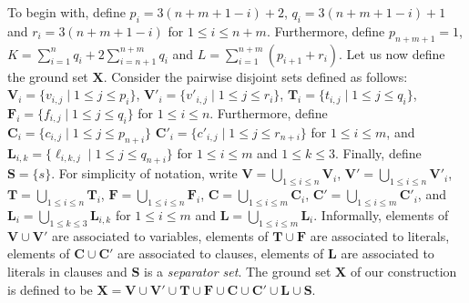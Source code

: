 \documentclass[a4paper,10pt]{llncs}
\begin{document}
To begin with, define 
$p_i = 3(n + m + 1 - i) + 2$,
$q_i = 3(n + m + 1 - i) + 1$ and
$r_i = 3(n + m + 1 - i)$ for $1 \leq i \leq n + m$.
Furthermore, define $p_{n+m+1}=1$,
$K = \sum_{i=1}^{n} q_i + 2 \sum_{i=n+1}^{n+m} q_i$ and
$L = \sum_{i=1}^{n+m} (p_{i+1} + r_i)$.
Let us now define the ground set $\mathbf{X}$. 
Consider the pairwise disjoint sets defined as follows:
$\mathbf{V}_i = \{v_{i, j} \mid 1 \leq j \leq p_i\}$,
$\mathbf{V}'_i  = \{v'_{i, j} \mid 1 \leq j \leq r_i\}$,
$\mathbf{T}_i = \{t_{i, j} \mid 1 \leq j \leq q_i\}$,
$\mathbf{F}_i = \{f_{i, j} \mid 1 \leq j \leq q_i\}$
for $1 \leq i \leq n$. Furthermore, define
$\mathbf{C}_i = \{c_{i, j} \mid 1 \leq j \leq p_{n + i}\}$
$\mathbf{C}'_i = \{c'_{i, j} \mid 1 \leq j \leq r_{n + i}\}$
for $1 \leq i \leq m$, and
$\mathbf{L}_{i, k} = \{\ell_{i, k, j} \mid 1 \leq j \leq q_{n + i}\}$
for $1 \leq i \leq m$ and $1 \leq k \leq 3$.
Finally, define $\mathbf{S} = \{s\}$.
For simplicity of notation, write
$\mathbf{V} = \bigcup_{1 \leq i \leq n} \mathbf{V}_i$,
$\mathbf{V}'= \bigcup_{1 \leq i \leq n} \mathbf{V}'_i$,
$\mathbf{T} = \bigcup_{1 \leq i \leq n} \mathbf{T}_i$,
$\mathbf{F} = \bigcup_{1 \leq i \leq n} \mathbf{F}_i$,
$\mathbf{C} = \bigcup_{1 \leq i \leq m} \mathbf{C}_i$,
$\mathbf{C}' = \bigcup_{1 \leq i \leq m} \mathbf{C}'_i$,
and
$\mathbf{L}_i = \bigcup_{1 \leq k \leq 3} \mathbf{L}_{i, k}$
for $1 \leq i \leq m$
and
$\mathbf{L} = \bigcup_{1 \leq i \leq m} \mathbf{L}_i$.
Informally, elements of $\mathbf{V} \cup \mathbf{V}'$ are associated to variables, 
elements of $\mathbf{T} \cup \mathbf{F}$ are associated to literals, elements of 
$\mathbf{C} \cup \mathbf{C}'$ are associated to clauses, elements of $\mathbf{L}$ 
are associated to literals in clauses and $\mathbf{S}$ is a  
\emph{separator set}. The ground set $\mathbf{X}$ of our construction is defined to be
$\mathbf{X} = 
\mathbf{V} \cup \mathbf{V}' \cup \mathbf{T} \cup 
\mathbf{F} \cup \mathbf{C} \cup \mathbf{C}' \cup 
\mathbf{L} \cup \mathbf{S}$.
\end{document}
